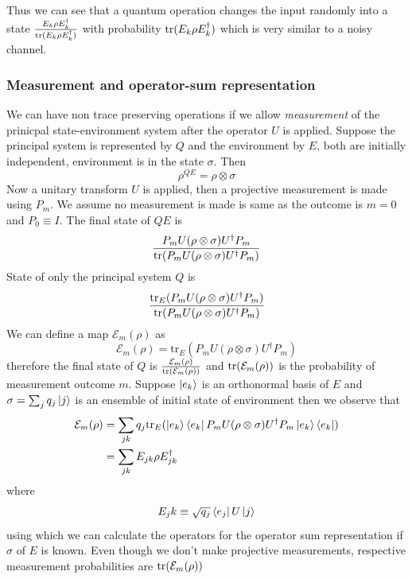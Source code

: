 Thus we can see that a quantum operation changes the input randomly into a state $\frac{E_k\rho E_k^\dag}{\text{tr}(E_k\rho E_k^\dag)}$ with probability $\text{tr}(E_k\rho E_k^\dag)$ which is very similar to a noisy channel.

\subsubsection{Measurement and operator-sum representation}
We can have non trace preserving operations if we allow \textit{measurement} of the prinicpal state-environment system after the operator $U$ is applied. Suppose the principal system is represented by $Q$ and the environment by $E$, both are initially independent, environment is in the state $\sigma$. Then
\begin{equation}
    \rho^{QE} = \rho \otimes \sigma
\end{equation}
Now a unitary transform $U$ is applied, then a projective measurement is made using $P_m$. We assume no measurement is made is same as the outcome is $m=0$ and $P_0\equiv I$. The final state of $QE$ is
\begin{equation}
    \frac{P_m U(\rho \otimes \sigma) U^\dag P_m}{\text{tr}(P_m U(\rho \otimes \sigma) U^\dag P_m)}
\end{equation}
State of only the principal system $Q$ is
\begin{equation}
    \frac{\text{tr}_E(P_m U(\rho \otimes \sigma) U^\dag P_m)}{\text{tr}(P_m U(\rho \otimes \sigma) U^\dag P_m)}
\end{equation}
We can define a map $\mathcal{E}_m(\rho)$ as
\begin{equation}
    \mathcal{E}_m(\rho) = \text{tr}_E(P_m U(\rho \otimes \sigma) U^\dag P_m)
\end{equation}
therefore the final state of $Q$ is $\frac{\mathcal{E}_m(\rho)}{\text{tr}(\mathcal{E}_m(\rho))}$ and $\text{tr}(\mathcal{E}_m(\rho))$ is the probability of measurement outcome $m$. Suppose $\ket{e_k}$ is an orthonormal basis of $E$ and $\sigma=\sum_j q_j\ket{j}$ is an ensemble of initial state of environment then we observe that
\begin{align}
    \mathcal{E}_m(\rho) &= \sum_{jk} q_j\text{tr}_E(\ket{e_k}\bra{e_k}P_m U(\rho \otimes \sigma) U^\dag P_m\ket{e_k}\bra{e_k}) \\
    &= \sum_{jk} E_{jk} \rho E_{jk}^\dag
\end{align}
where
\begin{equation}
        E_jk \equiv \sqrt{q_j}\bra{e_j}U\ket{j}
\end{equation}
using which we can calculate the operators for the operator sum representation if $\sigma$ of $E$ is known. Even though we don't make projective measurements, respective measurement probabilities are $\text{tr}(\mathcal{E}_m(\rho))$

